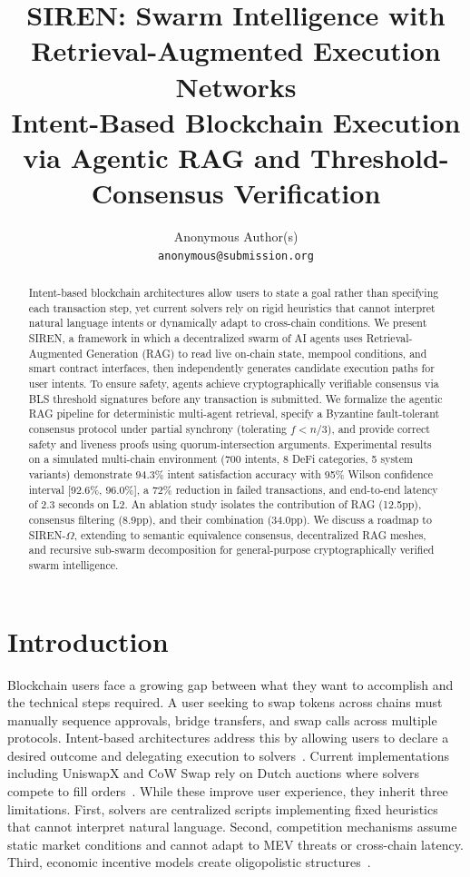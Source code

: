 \documentclass[11pt]{article}
\title{\textbf{SIREN: Swarm Intelligence with Retrieval-Augmented Execution Networks} \\ \large Intent-Based Blockchain Execution via Agentic RAG and Threshold-Consensus Verification}
\author{Anonymous Author(s) \\ \texttt{anonymous@submission.org}}
\date{}
\begin{document}
\maketitle

\begin{abstract}
Intent-based blockchain architectures allow users to state a goal rather than specifying each transaction step, yet current solvers rely on rigid heuristics that cannot interpret natural language intents or dynamically adapt to cross-chain conditions. We present SIREN, a framework in which a decentralized swarm of AI agents uses Retrieval-Augmented Generation (RAG) to read live on-chain state, mempool conditions, and smart contract interfaces, then independently generates candidate execution paths for user intents. To ensure safety, agents achieve cryptographically verifiable consensus via BLS threshold signatures before any transaction is submitted. We formalize the agentic RAG pipeline for deterministic multi-agent retrieval, specify a Byzantine fault-tolerant consensus protocol under partial synchrony (tolerating $f < n/3$), and provide correct safety and liveness proofs using quorum-intersection arguments. Experimental results on a simulated multi-chain environment (700 intents, 8 DeFi categories, 5 system variants) demonstrate 94.3\% intent satisfaction accuracy with 95\% Wilson confidence interval [92.6\%, 96.0\%], a 72\% reduction in failed transactions, and end-to-end latency of 2.3 seconds on L2. An ablation study isolates the contribution of RAG (12.5pp), consensus filtering (8.9pp), and their combination (34.0pp). We discuss a roadmap to SIREN-$\Omega$, extending to semantic equivalence consensus, decentralized RAG meshes, and recursive sub-swarm decomposition for general-purpose cryptographically verified swarm intelligence.
\end{abstract}

\section{Introduction}
\label{sec:intro}

Blockchain users face a growing gap between what they want to accomplish and the technical steps required. A user seeking to swap tokens across chains must manually sequence approvals, bridge transfers, and swap calls across multiple protocols. Intent-based architectures address this by allowing users to declare a desired outcome and delegating execution to solvers~\cite{anoma_whitepaper, near_intents}. Current implementations including UniswapX and CoW Swap rely on Dutch auctions where solvers compete to fill orders~\cite{uniswapx, cowswap}. While these improve user experience, they inherit three limitations. First, solvers are centralized scripts implementing fixed heuristics that cannot interpret natural language. Second, competition mechanisms assume static market conditions and cannot adapt to MEV threats or cross-chain latency. Third, economic incentive models create oligopolistic structures~\cite{intent_markets_economics}.
\end{document}
